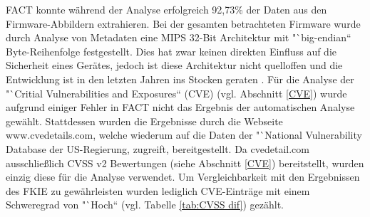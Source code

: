 \documentclass[a4paper]{book}
\begin{document}
\begin{large}
\begin{onehalfspace}
\noindent FACT konnte während der Analyse erfolgreich 92,73\% der Daten aus den Firmware-Abbildern extrahieren. Bei der gesamten betrachteten Firmware wurde durch Analyse von Metadaten eine MIPS 32-Bit Architektur mit "`big-endian“ Byte-Reihenfolge festgestellt. Dies hat zwar keinen direkten Einfluss auf die Sicherheit eines Gerätes, jedoch ist diese Architektur nicht quelloffen und die Entwicklung ist in den letzten Jahren ins Stocken geraten \cite{Halfacree.2020}. Für die Analyse der "`Critial Vulnerabilities and Exposures“ (CVE) (vgl. Abschnitt \ref{CVE}) wurde aufgrund einiger Fehler in FACT nicht das Ergebnis der automatischen Analyse gewählt. Stattdessen wurden die Ergebnisse durch die Webseite www.cvedetails.com, welche wiederum auf die Daten der "`National Vulnerability Database\grqq{} der US-Regierung, zugreift, bereitgestellt. Da cvedetail.com ausschließlich CVSS v2 Bewertungen (siehe Abschnitt \ref{CVE}) bereitstellt, wurden einzig diese für die Analyse verwendet. Um Vergleichbarkeit mit den Ergebnissen des FKIE zu gewährleisten wurden lediglich CVE-Einträge mit einem Schweregrad von "`Hoch“ (vgl. Tabelle \ref{tab:CVSS dif}) gezählt.

\end{onehalfspace}


\end{large}
\end{document}
